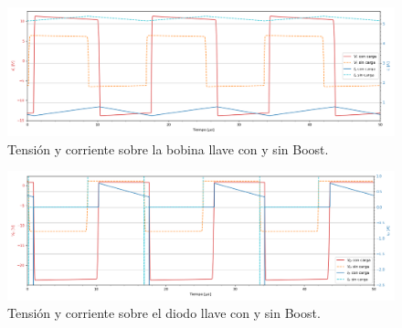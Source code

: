 \begin{multicols}{2}
\begin{figure}[H]
	\centering
	\includegraphics[width=\linewidth]{ImagenesEjercicio-3/il-vl-1v3}
	\caption{Tensión y corriente sobre la bobina llave con y sin Boost.}
	\label{fig:ej3:Il_Vl_SWITCH_BOOST}
\end{figure}

\begin{figure}[H]
	\centering
	\includegraphics[width=\linewidth]{ImagenesEjercicio-3/id-vd-1v3}
	\caption{Tensión y corriente sobre el diodo llave con y sin Boost.}
	\label{fig:ej3:Id_Vd_SWITCH_BOOST}
\end{figure}

\end{multicols}

%
